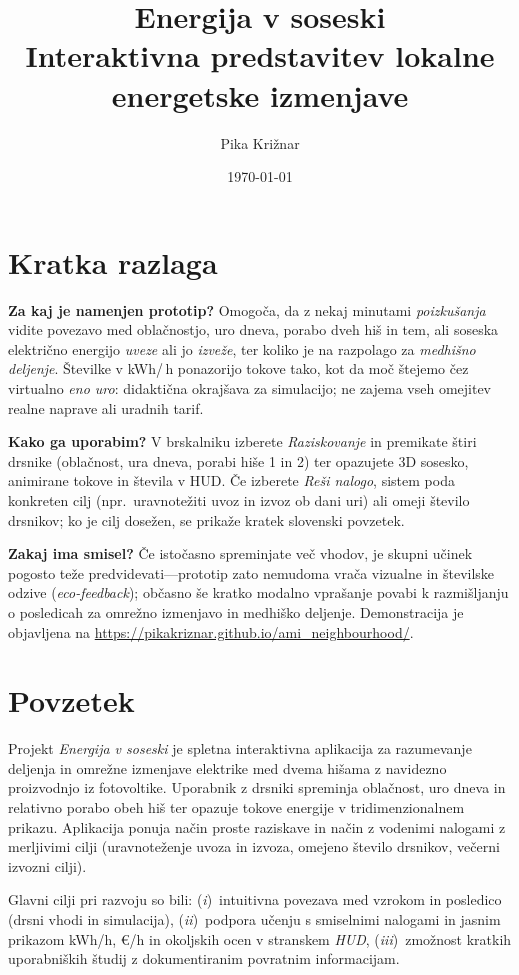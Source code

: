 \documentclass[a4paper,11pt]{article}
\title{\textbf{Energija v soseski}\\[0.25em]\large Interaktivna predstavitev lokalne energetske izmenjave}
\author{Pika Križnar}
\date{\today}
\begin{document}
\maketitle

\section*{Kratka razlaga}
\textbf{Za kaj je namenjen prototip?} Omogoča, da z nekaj minutami \emph{poizkušanja} vidite povezavo med oblačnostjo, uro dneva, porabo dveh hiš in tem, ali soseska električno energijo \emph{uveze} ali jo \emph{izveže}, ter koliko je na razpolago za \emph{medhišno deljenje}.
Številke v kWh/\,h ponazorijo tokove tako, kot da moč štejemo čez virtualno \emph{eno uro}: didaktična okrajšava za simulacijo; ne zajema vseh omejitev realne naprave ali uradnih tarif.

\textbf{Kako ga uporabim?} V brskalniku izberete \emph{Raziskovanje} in premikate štiri drsnike (oblačnost, ura dneva, porabi hiše 1 in 2) ter opazujete 3D sosesko, animirane tokove in števila v HUD. Če izberete \emph{Reši nalogo}, sistem poda konkreten cilj (npr.\ uravnotežiti uvoz in izvoz ob dani uri) ali omeji število drsnikov; ko je cilj dosežen, se prikaže kratek slovenski povzetek.

\textbf{Zakaj ima smisel?} Če istočasno spreminjate več vhodov, je skupni učinek pogosto teže predvidevati---prototip zato nemudoma vrača vizualne in številske odzive (\emph{eco-feedback}); občasno še kratko modalno vprašanje povabi k razmišljanju o posledicah za omrežno izmenjavo in medhiško deljenje. Demonstracija je objavljena na \url{https://pikakriznar.github.io/ami_neighbourhood/}.

\section*{Povzetek}
Projekt \emph{Energija v soseski} je spletna interaktivna aplikacija za razumevanje deljenja in omrežne izmenjave elektrike med dvema hišama z navidezno proizvodnjo iz fotovoltike. Uporabnik z drsniki spreminja oblačnost, uro dneva in relativno porabo obeh hiš ter opazuje tokove energije v tridimenzionalnem prikazu. Aplikacija ponuja način proste raziskave in način z vodenimi nalogami z merljivimi cilji (uravnoteženje uvoza in izvoza, omejeno število drsnikov, večerni izvozni cilji).

Glavni cilji pri razvoju so bili: (\emph{i})~intuitivna povezava med vzrokom in posledico (drsni vhodi in simulacija), (\emph{ii})~podpora učenju s smiselnimi nalogami in jasnim prikazom kWh/h, €/h in okoljskih ocen v stranskem \emph{HUD}, (\emph{iii})~zmožnost kratkih uporabniških študij z dokumentiranim povratnim informacijam.
\end{document}
